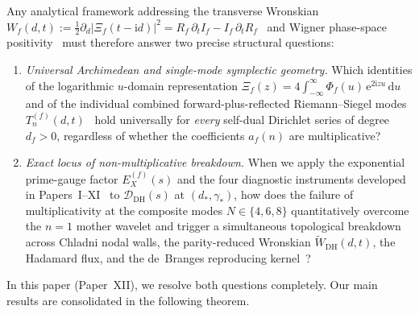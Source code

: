 \documentclass[11pt,reqno]{amsart}
\theoremstyle{definition}
\theoremstyle{remark}
\numberwithin{equation}{section}
\newcommand{\dd}{\mathrm{d}}
\newcommand{\ee}{\mathrm{e}}
\newcommand{\ii}{\mathrm{i}}
\newcommand{\DHf}{\mathrm{DH}}
\begin{document}
Any analytical framework addressing the transverse Wronskian $W_f(d,t) := \frac{1}{2}\partial_d|\Xi_f(t - \ii d)|^2 = R_f\,\partial_t I_f - I_f\,\partial_t R_f$~\cite{speiser1934,hinkkanen1997,lagarias1999} and Wigner phase-space positivity~\cite{wigner1932,hudson1974,csordas1986} must therefore answer two precise structural questions:
\begin{enumerate}[label=\textup{(\arabic*)},leftmargin=2.2em]
\item \textit{Universal Archimedean and single-mode symplectic geometry.} Which identities of the logarithmic $u$-domain representation $\Xi_f(z) = 4\int_{-\infty}^\infty \Phi_f(u)\,\ee^{2\ii zu}\,\dd u$ and of the individual combined forward-plus-reflected Riemann--Siegel modes $T_n^{(f)}(d,t)$~\cite{siegel1932,gabcke1979} hold universally for \emph{every} self-dual Dirichlet series of degree $d_f > 0$, regardless of whether the coefficients $a_f(n)$ are multiplicative?
\item \textit{Exact locus of non-multiplicative breakdown.} When we apply the exponential prime-gauge factor $E_X^{(f)}(s)$ and the four diagnostic instruments developed in Papers~I--XI~\cite{missiaen2026paper1,missiaen2026paper2,missiaen2026paper3,missiaen2026paper4,missiaen2026paper5,missiaen2026paper6,missiaen2026paper7,missiaen2026paper8,missiaen2026paper9,missiaen2026paper10,missiaen2026paper11} to $\mathcal{D}_{\DHf}(s)$ at $(d_*, \gamma_*)$, how does the failure of multiplicativity at the composite modes $N \in \{4, 6, 8\}$ quantitatively overcome the $n = 1$ mother wavelet and trigger a simultaneous topological breakdown across Chladni nodal walls, the parity-reduced Wronskian $\widetilde{W}_{\DHf}(d,t)$, the Hadamard flux, and the de~Branges reproducing kernel~\cite{debranges1968,conreyli2000,iohvidov1982}?
\end{enumerate}

In this paper (Paper~XII), we resolve both questions completely. Our main results are consolidated in the following theorem.
\end{document}
